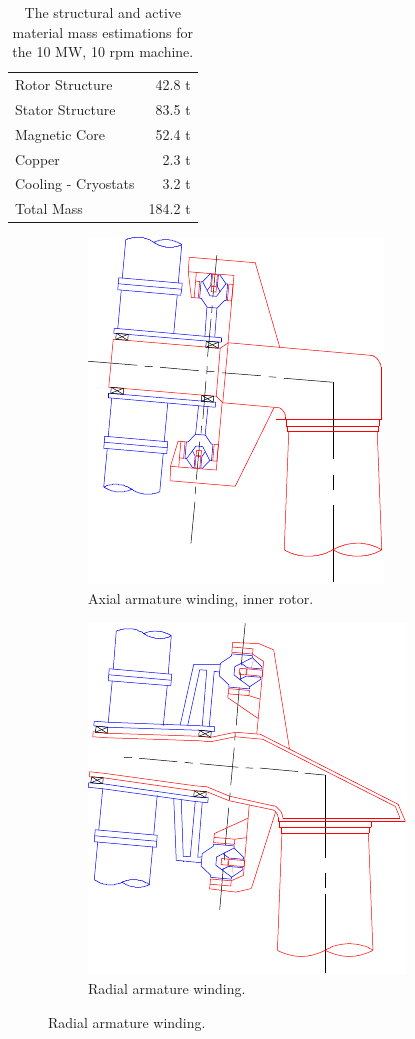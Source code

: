 \documentclass[12pt]{iopart}
\begin{document}
\begin{table}
  \centering
  \begin{tabular}{lr}
\hline
Rotor Structure & 42.8 t \\
Stator Structure & 83.5 t \\
\hline
Magnetic Core & 52.4 t\\
Copper & 2.3 t\\
Cooling - Cryostats & 3.2 t \\
\hline
Total Mass & 184.2 t \\
\hline
 \end{tabular}
  \caption{The structural and active material mass estimations for the 10 MW, 10 rpm machine.}
  \label{10MW_total_mass}
\end{table}

\begin{figure}[h!]
  \centering
  \begin{subfigure}{.4\columnwidth}
  \includegraphics[scale=1.2]{structure_claw_radial_inner}
  \caption{Axial armature winding, inner rotor.}
  \label{structure1}
  \end{subfigure}
  \begin{subfigure}{.4\columnwidth}
  \includegraphics[scale=1.2]{structure_claw_axial}
  \caption{Radial armature winding.}
  \label{structure2}
  \end{subfigure}


\end{figure}
\end{document}
